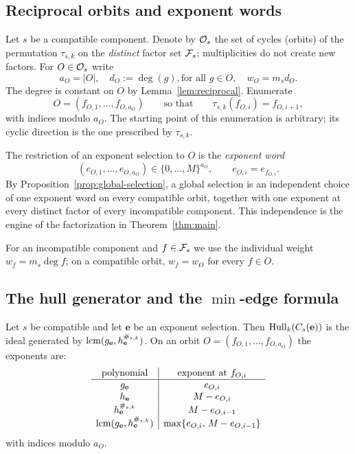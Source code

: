\subsection{Reciprocal orbits and exponent words}\label{sec:orbits}

Let $s$ be a compatible component.  Denote by $\mathcal O_s$ the set of cycles
(orbits) of the permutation $\tau_{s,k}$ on the \emph{distinct} factor set
$\mathcal F_s$; multiplicities do not create new factors.  For $O\in\mathcal O_s$ write
\[
a_O=|O|,\quad d_O:=\deg(g),\text{for all }g\in O,\quad
w_O=m_sd_O .
\]
The degree is constant on $O$ by Lemma~\ref{lem:reciprocal}.  Enumerate
\[
O=(f_{O,1},\ldots,f_{O,a_O})
\qquad\text{so that}\qquad
\tau_{s,k}(f_{O,i})=f_{O,i+1},
\]
with indices modulo $a_O$.  The starting point of this enumeration is arbitrary;
its cyclic direction is the one prescribed by $\tau_{s,k}$.

The restriction of an exponent selection to $O$ is the \emph{exponent word}
\[
(e_{O,1},\ldots,e_{O,a_O})\in\{0,\ldots,M\}^{a_O},
\qquad e_{O,i}=e_{f_{O,i}} .
\]
By Proposition~\ref{prop:global-selection}, a global selection is an
independent choice of one exponent word on every compatible orbit, together
with one exponent at every distinct factor of every incompatible component.
This independence is the engine of the factorization in
Theorem~\ref{thm:main}.

For an incompatible component and $f\in\mathcal F_s$ we use the individual weight
$w_f=m_s\deg f$; on a compatible orbit, $w_f=w_O$ for every $f\in O$.

\subsection{The hull generator and the \texorpdfstring{$\min$}{min}-edge
formula}\label{sec:min-edge}

\begin{lemma}\label{lem:hull-generator}
Let $s$ be compatible and let $\mathbf{e}$ be an exponent selection.  Then
$\operatorname{Hull}_k(C_s(\mathbf{e}))$ is the ideal generated by
$\operatorname{lcm}(g_{\mathbf{e}},h_{\mathbf{e}}^{\#_{s,k}})$.  On an orbit
$O=(f_{O,1},\ldots,f_{O,a_O})$ the exponents are:
{\small
\[
\begin{array}{c|c}
\text{polynomial} & \text{exponent at }f_{O,i}\\ \hline
 g_{\mathbf{e}} & e_{O,i}\\
 h_{\mathbf{e}} & M-e_{O,i}\\
 h_{\mathbf{e}}^{\#_{s,k}} & M-e_{O,i-1}\\
 \operatorname{lcm}(g_{\mathbf{e}},h_{\mathbf{e}}^{\#_{s,k}}) &
   \max\{e_{O,i},\,M-e_{O,i-1}\}
\end{array}
\]
}
with indices modulo $a_O$.
\end{lemma}


